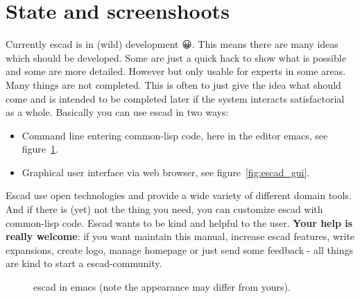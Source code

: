 \documentclass[a4paper, 12pt, openany]{scrbook}
\begin{document}
\section{State and screenshoots}
Currently escad is in (wild) development { 😀}. This means there are many ideas which should be developed. Some are just a quick hack to show what is possible and some are more detailed. However but only usable for experts in some areas. Many things are not completed. This is often to just give the idea what should come and is intended to be completed later if the system interacts satisfactorial as a whole.
Basically you can use escad in two ways:
\begin{itemize}
\item Command line entering common-lisp code, here in the editor emacs, see figure~\ref{fig:escad_emacs}.
\item Graphical user interface via web browser, see figure~\ref{fig:escad_gui}.
\end{itemize}
Escad use open technologies and provide a wide variety of different domain tools. And if there is (yet) not the thing you need, you can customize escad with common-lisp code. Escad wants to be kind and helpful to the user. \textbf{Your help is really welcome}: if you want maintain this manual, increase escad features, write expansions, create logo, manage homepage or just send some feedback - all things are kind to start a escad-community.
\begin{figure}[htbp]
  \centering
  \caption{escad in emacs (note the appearance may differ from yours).}
  \label{fig:escad_emacs}
\end{figure}
\end{document}
